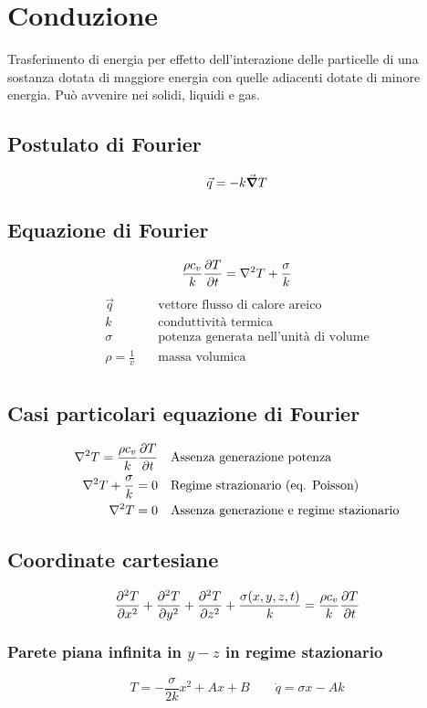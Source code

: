 \section{Conduzione}
Trasferimento di energia per effetto dell'interazione delle particelle di una sostanza dotata di maggiore energia con quelle adiacenti dotate di minore energia.
Può avvenire nei solidi, liquidi e gas.
\subsection{Postulato di Fourier}
\[ \vec{q} = - k \gradient{T} \]

\subsection{Equazione di Fourier}
\[ \frac{\rho c_v}{k} \pdv{T}{t} = \laplacian{T} + \frac{\sigma}{k} \]
\begin{align*}
\vec{q} & \quad \text{vettore flusso di calore areico} \\
k & \quad \text{conduttività termica} \\
\sigma & \quad \text{potenza generata nell'unità di volume} \\
\rho = \frac{1}{v} & \quad \text{massa volumica} \\
\end{align*}

\subsection{Casi particolari equazione di Fourier}
\begin{align*}
\laplacian{T} = \frac{\rho c_v}{k} \pdv{T}{t} & \quad \text{Assenza generazione potenza} \\
\laplacian{T} + \frac{\sigma}{k} = 0 & \quad \text{Regime strazionario (eq. Poisson)}\\
\laplacian{T} = 0 & \quad \text{Assenza generazione e regime stazionario}\\
\end{align*}

\subsection{Coordinate cartesiane}
\[ \pdv[2]{T}{x} + \pdv[2]{T}{y} + \pdv[2]{T}{z} + \frac{\sigma(x,y,z,t)}{k} = \frac{\rho c_v}{k}\pdv{T}{t} \]
\subsubsection{Parete piana infinita in $y-z$ in regime stazionario}
\[ T = -\frac{\sigma}{2k}x^2 + Ax + B \qquad \dot{q} = \sigma x - Ak \]

